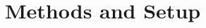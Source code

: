 \documentclass[english,12pt,a4paper,pdftex,elec,utf8]{aaltothesis}
\begin{document}



\clearpage

\section{Methods and Setup}
\end{document}
